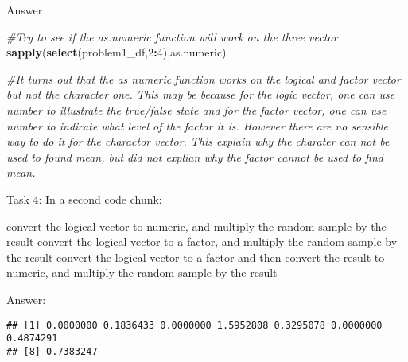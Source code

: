 \documentclass[]{article}
\newenvironment{Shaded}{\begin{snugshade}}{\end{snugshade}}
\newcommand{\CommentTok}[1]{\textcolor[rgb]{0.56,0.35,0.01}{\textit{#1}}}
\newcommand{\DecValTok}[1]{\textcolor[rgb]{0.00,0.00,0.81}{#1}}
\newcommand{\KeywordTok}[1]{\textcolor[rgb]{0.13,0.29,0.53}{\textbf{#1}}}
\newcommand{\NormalTok}[1]{#1}
\newcommand{\OperatorTok}[1]{\textcolor[rgb]{0.81,0.36,0.00}{\textbf{#1}}}
\newcommand{\StringTok}[1]{\textcolor[rgb]{0.31,0.60,0.02}{#1}}
\begin{document}
Answer

\begin{Shaded}
\begin{Highlighting}[]
\CommentTok{#Try to see if the as.numeric function will work on the three vector}
\KeywordTok{sapply}\NormalTok{(}\KeywordTok{select}\NormalTok{(problem1_df,}\DecValTok{2}\OperatorTok{:}\DecValTok{4}\NormalTok{),as.numeric)}

\CommentTok{#It turns out that the as numeric.function works on the logical and factor vector but not the character one. This may be because for the logic vector, one can use number to illustrate the true/false state and for the factor vector, one can use number to indicate what level of the factor it is. However there are no sensible way to do it for the charactor vector. This explain why the charater can not be used to found mean, but did not explian why the factor cannot be used to find mean. }
\end{Highlighting}
\end{Shaded}

Task 4: In a second code chunk:

convert the logical vector to numeric, and multiply the random sample by
the result convert the logical vector to a factor, and multiply the
random sample by the result convert the logical vector to a factor and
then convert the result to numeric, and multiply the random sample by
the result

Answer:

\begin{Shaded}
\end{Shaded}

\begin{verbatim}
## [1] 0.0000000 0.1836433 0.0000000 1.5952808 0.3295078 0.0000000 0.4874291
## [8] 0.7383247
\end{verbatim}

\begin{Shaded}
\end{Shaded}
\end{document}
